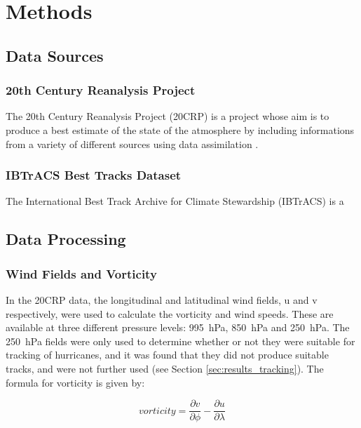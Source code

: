 \documentclass[pdftex,12pt,a4paper]{report}
\begin{document}
\chapter{Methods}

\section{Data Sources}

\subsection{20th Century Reanalysis Project}
The 20th Century Reanalysis Project (20CRP) is a project whose aim is to produce a best estimate of the state of the atmosphere by including informations from a variety of different sources using data assimilation \parencite{compoTwentieth2011}.

\subsection{IBTrACS Best Tracks Dataset}
The International Best Track Archive for Climate Stewardship (IBTrACS) \parencite{knappInternational2010} is a 

\section{Data Processing}

\subsection{Wind Fields and Vorticity}

In the 20CRP data, the longitudinal and latitudinal wind fields, u and v respectively, were used to calculate the vorticity and wind speeds. These are available at three different pressure levels: \SI{995}{hPa}, \SI{850}{hPa} and \SI{250}{hPa}. The \SI{250}{hPa} fields were only used to determine whether or not they were suitable for tracking of hurricanes, and it was found that they did not produce suitable tracks, and were not further used (see Section \ref{sec:results_tracking}). The formula for vorticity is given by:

\begin{equation}
    vorticity = \frac{\partial v}{\partial \phi} - \frac{\partial u}{\partial \lambda}
    \label{eqn:vorticity}
\end{equation}
\end{document}
